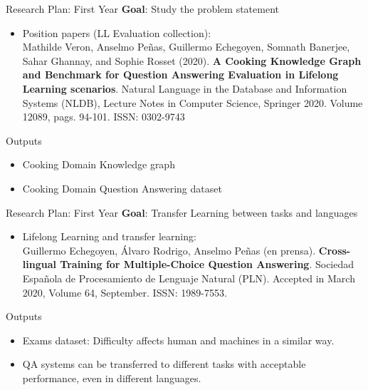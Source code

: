 \documentclass{beamer}
\begin{document}
\begin{frame}{Research Plan: First Year}
  \vspace{-0.5cm}
  \alert{\textbf{Goal}}: Study the problem statement
  \vspace{0.1cm}
  \begin{itemize}
    \item Position papers (LL Evaluation collection): \\
      {\small Mathilde Veron, Anselmo Peñas, Guillermo Echegoyen, Somnath Banerjee, Sahar Ghannay, and Sophie Rosset (2020). \textbf{A Cooking Knowledge Graph and Benchmark for Question Answering Evaluation in Lifelong Learning scenarios}. Natural Language in the Database and Information Systems (NLDB), Lecture Notes in Computer Science, Springer 2020. Volume 12089, pags. 94-101. ISSN: 0302-9743 \cite{veron_nldb_2020}}
  \end{itemize}
  \begin{block}{Outputs}
    \begin{itemize}
      \item Cooking Domain Knowledge graph
      \item Cooking Domain Question Answering dataset
    \end{itemize}
  \end{block}
\end{frame}

\begin{frame}{Research Plan: First Year}
  \vspace{-0.5cm}
  \alert{\textbf{Goal}}: Transfer Learning between tasks and languages
  \vspace{0.1cm}
  \begin{itemize}
    \item Lifelong Learning and transfer learning: \\
      {\small Guillermo Echegoyen, Álvaro Rodrigo, Anselmo Peñas (en prensa). \textbf{Cross-lingual Training for Multiple-Choice Question Answering}. Sociedad Española de Procesamiento de Lenguaje Natural (PLN). Accepted in March 2020, Volume 64, September. ISSN: 1989-7553. \cite{echegoyen_sepln_2020}}
  \end{itemize}
  \begin{block}{Outputs}
    \begin{itemize}
      \item Exams dataset: Difficulty affects human and machines in a similar way.
      \item QA systems can be transferred to different tasks with acceptable performance, even in different languages.
    \end{itemize}
  \end{block}
\end{frame}
\end{document}
